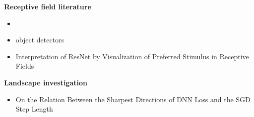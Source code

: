 \textbf{Receptive field literature}
\begin{itemize}
  \item \cite{luoUnderstandingEffectiveReceptive2016}
    \item object detectors \cite{zhouObjectDetectorsEmerge2015}
      \item Interpretation of ResNet by Visualization of Preferred Stimulus in Receptive Fields \cite{kobayashiInterpretationResNetVisualization2020}
\end{itemize}
\textbf{Landscape investigation}
\begin{itemize}
  \item On the Relation Between the Sharpest Directions of DNN Loss and the SGD Step Length \cite{jastrzebskiRelationSharpestDirections2019}
\end{itemize}
